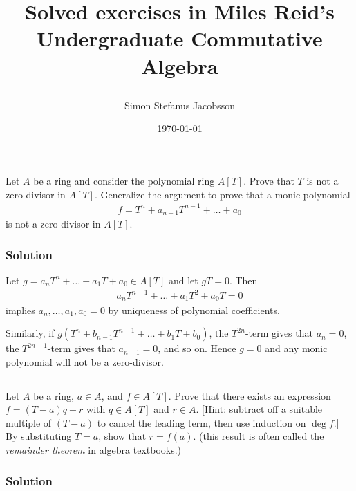 
\title{{\Huge {}}
	\parbox{0.85\textwidth}{
		\centering
		Solved exercises in Miles Reid's Undergraduate Commutative Algebra
	}
	{\Huge {}}}
\author{Simon Stefanus Jacobsson}
\date{\today}

	

\maketitle

\subsection{}

Let $A$ be a ring and consider the polynomial ring $A[T]$. Prove that $T$ is not a zero-divisor in $A[T]$. Generalize the argument to prove that a monic polynomial
\begin{align}
	f = T^n + a_{n - 1} T^{n - 1} + \ldots + a_0
\end{align}
is not a zero-divisor in $A[T]$.

\subsubsection*{Solution}
Let $g = a_n T^n + \ldots + a_1 T + a_0 \in A[T]$ and let $g T = 0$. Then
\begin{align}
	a_n T^{n + 1} + \ldots + a_1 T^2 + a_0 T = 0
\end{align}
implies $a_n, \ldots, a_1, a_0 = 0$ by uniqueness of polynomial coefficients.

Similarly, if $g (T^n + b_{n-1} T^{n - 1} + \ldots + b_1 T + b_0)$, the $T^{2 n}$-term gives that $a_n = 0$, the $T^{2 n -1}$-term gives that $a_{n - 1} = 0$, and so on. Hence $g = 0$ and any monic polynomial will not be a zero-divisor.


\subsection{}

Let $A$ be a ring, $a \in A$, and $f \in A[T]$. Prove that there exists an expression $f = (T - a) q + r$ with $q \in A[T]$ and $r \in A$. [Hint: subtract off a suitable multiple of $(T - a)$ to cancel the leading term, then use induction on $\operatorname{deg} f$.] By substituting $T = a$, show that $r = f(a)$. (this result is often called the \emph{remainder theorem} in algebra textbooks.)

\subsubsection*{Solution}

